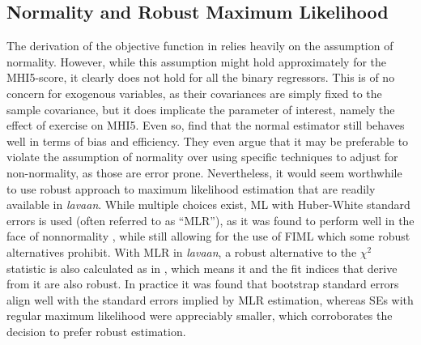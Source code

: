 \subsection{Normality and Robust Maximum Likelihood}
\label{sec:methods:normality_mlr}
The derivation of the objective function in  relies heavily on the assumption
of normality. However, while this assumption might hold approximately for the MHI5-score, it clearly does not hold
for all the binary regressors. This is of no concern for exogenous variables, as their covariances are simply fixed
to the sample covariance, but it does implicate the parameter of interest, namely the effect of exercise on MHI5.
Even so,  find that the normal estimator still behaves well in terms of bias and
efficiency. They even argue that it may be preferable to violate the assumption of normality over using specific
techniques to adjust for non-normality, as those are error prone.
Nevertheless, it would seem worthwhile to use robust approach to maximum likelihood estimation that are readily
available in \textit{lavaan}. While multiple choices exist, ML with Huber-White standard errors is used (often
referred to as ``MLR''), as it was found to perform well in the face of nonnormality \cite{zhong2011bias}, while
still allowing for the use of FIML which some robust alternatives prohibit.
With MLR in \textit{lavaan}, a robust alternative to the $\chi^2$ statistic is also calculated as in ,
which means it and the fit indices that derive from it are also robust.
In practice it was found that bootstrap standard errors align well with the standard errors implied by MLR estimation,
whereas SEs with regular maximum likelihood were appreciably smaller, which corroborates the decision to prefer
robust estimation.
